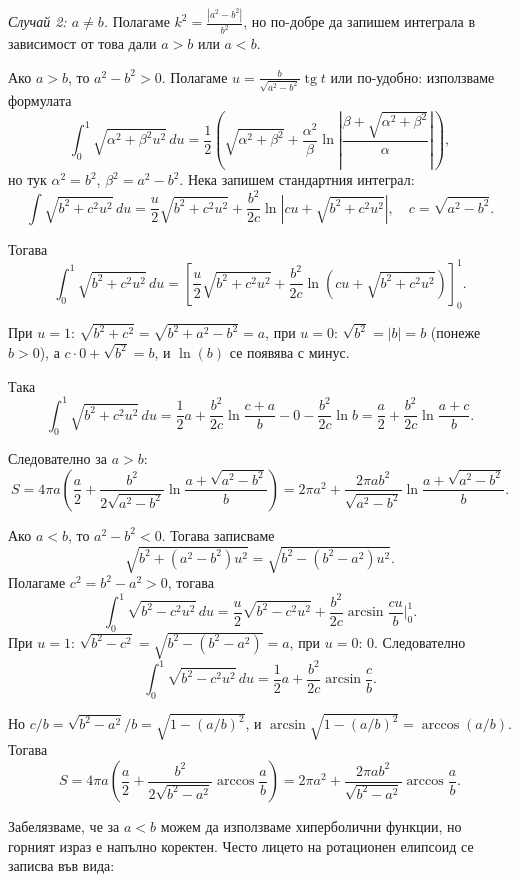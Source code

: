 \documentclass[10pt]{article}
\begin{document}
\textit{Случай 2: $a \neq b$.} 
Полагаме $k^2 = \frac{|a^2-b^2|}{b^2}$, но по-добре да запишем интеграла в зависимост от това дали $a>b$ или $a<b$.

Ако $a > b$, то $a^2 - b^2 > 0$. Полагаме $u = \frac{b}{\sqrt{a^2-b^2}} \operatorname{tg} t$ или по-удобно: използваме формулата
\[
\int_0^1 \sqrt{\alpha^2 + \beta^2 u^2}\,du = \frac{1}{2} \left( \sqrt{\alpha^2+\beta^2} + \frac{\alpha^2}{\beta} \ln\left|\frac{\beta+\sqrt{\alpha^2+\beta^2}}{\alpha}\right| \right),
\]
но тук $\alpha^2 = b^2$, $\beta^2 = a^2-b^2$. Нека запишем стандартния интеграл:
\[
\int \sqrt{b^2 + c^2 u^2}\,du = \frac{u}{2}\sqrt{b^2 + c^2 u^2} + \frac{b^2}{2c} \ln\left| cu + \sqrt{b^2 + c^2 u^2} \right|, \quad c = \sqrt{a^2-b^2}.
\]

Тогава
\[
\int_0^1 \sqrt{b^2 + c^2 u^2}\,du = \left[ \frac{u}{2}\sqrt{b^2 + c^2 u^2} + \frac{b^2}{2c} \ln\left( cu + \sqrt{b^2 + c^2 u^2} \right) \right]_0^1.
\]

При $u=1$: $\sqrt{b^2 + c^2} = \sqrt{b^2 + a^2 - b^2} = a$, при $u=0$: $\sqrt{b^2} = |b| = b$ (понеже $b>0$), а $c\cdot0 + \sqrt{b^2} = b$, и $\ln(b)$ се появява с минус.

Така
\[
\int_0^1 \sqrt{b^2 + c^2 u^2}\,du = \frac{1}{2} a + \frac{b^2}{2c} \ln\frac{c + a}{b} - 0 - \frac{b^2}{2c} \ln b = \frac{a}{2} + \frac{b^2}{2c} \ln\frac{a+c}{b}.
\]

Следователно за $a > b$:
\[
S = 4\pi a \left( \frac{a}{2} + \frac{b^2}{2\sqrt{a^2-b^2}} \ln\frac{a+\sqrt{a^2-b^2}}{b} \right) = 2\pi a^2 + \frac{2\pi a b^2}{\sqrt{a^2-b^2}} \ln\frac{a+\sqrt{a^2-b^2}}{b}.
\]

Ако $a < b$, то $a^2-b^2 < 0$. Тогава записваме
\[
\sqrt{b^2 + (a^2-b^2)u^2} = \sqrt{b^2 - (b^2-a^2)u^2}.
\]
Полагаме $c^2 = b^2-a^2 > 0$, тогава
\[
\int_0^1 \sqrt{b^2 - c^2 u^2}\,du = \frac{u}{2}\sqrt{b^2 - c^2 u^2} + \frac{b^2}{2c} \arcsin\frac{cu}{b} \Big|_0^1.
\]
При $u=1$: $\sqrt{b^2 - c^2} = \sqrt{b^2 - (b^2-a^2)} = a$, при $u=0$: $0$. Следователно
\[
\int_0^1 \sqrt{b^2 - c^2 u^2}\,du = \frac{1}{2} a + \frac{b^2}{2c} \arcsin\frac{c}{b}.
\]

Но $c/b = \sqrt{b^2-a^2}/b = \sqrt{1 - (a/b)^2}$, и $\arcsin\sqrt{1 - (a/b)^2} = \arccos(a/b)$. Тогава
\[
S = 4\pi a \left( \frac{a}{2} + \frac{b^2}{2\sqrt{b^2-a^2}} \arccos\frac{a}{b} \right) = 2\pi a^2 + \frac{2\pi a b^2}{\sqrt{b^2-a^2}} \arccos\frac{a}{b}.
\]

Забелязваме, че за $a < b$ можем да използваме хиперболични функции, но горният израз е напълно коректен. Често лицето на ротационен елипсоид се записва във вида:
\end{document}
